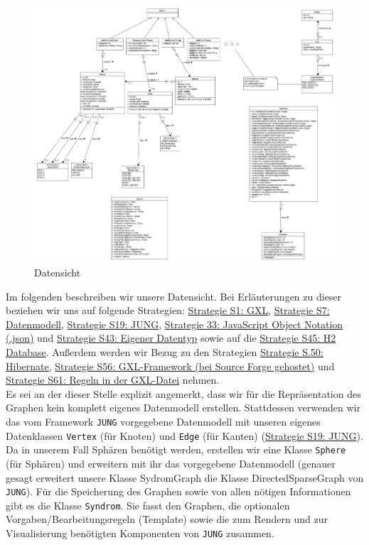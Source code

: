 \documentclass[enabledeprecatedfontcommands,fontsize=11pt,paper=a4,twoside]{scrartcl}
\newcounter{one}
\begin{document}
\begin{figure}[ht]
\centering
\includegraphics[width=1\textwidth]{Datenmodell_SWP2019.jpg}
\caption{Datensicht}
\end{figure}

\newpage
Im folgenden beschreiben wir unsere Datensicht. Bei Erläuterungen zu dieser beziehen wir uns auf folgende Strategien: \hyperlink{yy}{Strategie S1: GXL}, \hyperlink{aaa}{Strategie S7: Datenmodell}, \hyperlink{eee}{Strategie S19: JUNG}, \hyperlink{jjj}{Strategie 33: JavaScript Object Notation (.json)} und \hyperlink{ooo}{Strategie S43: Eigener Datentyp} sowie auf die \hyperlink{ppp}{Strategie S45: H2 Database}. Außerdem werden wir Bezug zu den Strategien \hyperlink{rrr}{Strategie S.50: Hibernate}, \hyperlink{ttt}{Strategie S56: GXL-Framework (bei Source Forge gehostet)} und \hyperlink{vvv}{Strategie S61: Regeln in der GXL-Datei} nehmen.\\

Es sei an der dieser Stelle explizit angemerkt, dass wir für die Repräsentation des Graphen kein komplett eigenes Datenmodell erstellen. Stattdessen verwenden wir das vom Framework \texttt{JUNG} vorgegebene Datenmodell mit unseren eigenes Datenklassen \texttt{Vertex} (für Knoten) und \texttt{Edge} (für Kanten) (\hyperlink{eee}{Strategie S19: JUNG}). Da in unserem Fall Sphären benötigt werden, erstellen wir eine Klasse \texttt{Sphere} (für Sphären) und erweitern mit ihr das vorgegebene Datenmodell (genauer gesagt erweitert unsere Klasse SydromGraph die Klasse DirectedSparseGraph von \texttt{JUNG}). 
Für die Speicherung des Graphen sowie von allen nötigen Informationen gibt es die Klasse \texttt{Syndrom}. Sie fasst den Graphen, die optionalen Vorgaben/Bearbeitungsregeln (Template) sowie die zum Rendern und zur Visualisierung benötigten Komponenten von \texttt{JUNG} zusammen. \\
\end{document}
